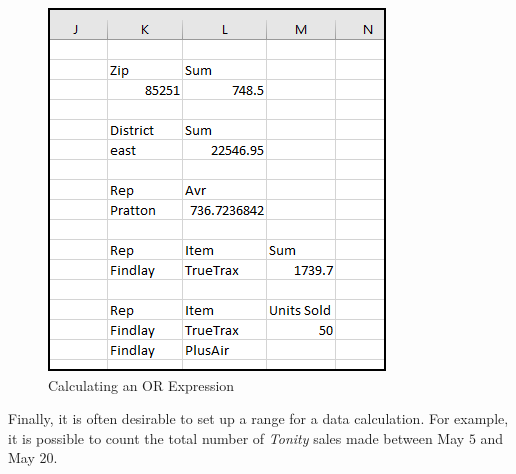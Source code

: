 \begin{figure}[H]
	\centering
	\includegraphics[width=\maxwidth{.65\linewidth}]{gfx/ch09_fig23}
	\caption{Calculating an OR Expression}
	\label{09:fig23}
\end{figure}
	
Finally, it is often desirable to set up a range for a data calculation. For example, it is possible to count the total number of \textit{Tonity} sales made between May $ 5 $ and May $ 20 $.

